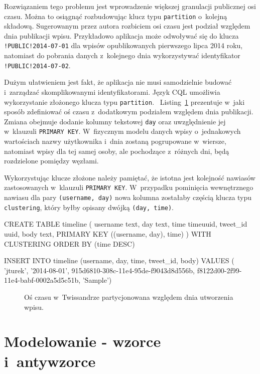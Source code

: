 Rozwiązaniem tego problemu jest wprowadzenie większej granulacji publicznej osi czasu. Można to osiągnąć rozbudowując klucz typu \verb+partition+ o~kolejną składową. Sugerowanym przez autora rozbiciem osi czasu jest podział względem dnia publikacji wpisu. Przykładowo aplikacja może odwoływać się do klucza \verb+!PUBLIC!2014-07-01+ dla wpisów opublikowanych pierwszego lipca 2014 roku, natomiast do pobrania danych z~kolejnego dnia wykorzystywać identyfikator \verb+!PUBLIC!2014-07-02+. 

Dużym ułatwieniem jest fakt, że aplikacja nie musi samodzielnie budować i~zarządzać skomplikowanymi identyfikatorami. Język CQL umożliwia wykorzystanie złożonego klucza typu \verb+partition+.~\cite{create_table_cassandra_reference} Listing~\ref{lst:timeline_day_partitioned} prezentuje w~jaki sposób zdefiniować oś czasu z~dodatkowym podziałem względem dnia publikacji. Zmiana obejmuje dodanie kolumny tekstowej \verb+day+ oraz uwzględnienie jej w~klauzuli \verb+PRIMARY KEY+. W~fizycznym modelu danych wpisy o~jednakowych wartościach nazwy użytkownika i~dnia zostaną pogrupowane w~wiersze, natomiast wpisy dla tej samej osoby, ale pochodzące z~różnych dni, będą rozdzielone pomiędzy węzłami.

Wykorzystując klucze złożone należy pamiętać, że istotna jest kolejność nawiasów zastosowanych w~klauzuli \verb+PRIMARY KEY+. W~przypadku pominięcia wewnętrznego nawiasu dla pary \verb+(username, day)+ nowa kolumna zostałaby częścią klucza typu \verb+clustering+, który byłby opisany dwójką \verb+(day, time)+.

\begin{verbbox}
CREATE TABLE timeline (
    username text,
    day text,
    time timeuuid,
    tweet_id uuid,
    body text,
    PRIMARY KEY ((username, day), time)
) WITH CLUSTERING ORDER BY (time DESC)

INSERT INTO timeline (username, day, time, 
        tweet_id, body) VALUES (
    'jturek',
    '2014-08-01',
    915d6810-308c-11e4-95de-f9043d8d556b,
    f8122d00-2f99-11e4-babf-0002a5d5c51b,
    'Sample')
\end{verbbox}

\begin{figure}[ht!]
	\centering
	\theverbbox
	\caption{Oś czasu w~Twissandrze partycjonowana względem dnia utworzenia wpisu.}
	\label{lst:timeline_day_partitioned}
\end{figure}

\section{Modelowanie - wzorce i~antywzorce}
\label{sec:patterns_and_antipatterns}

